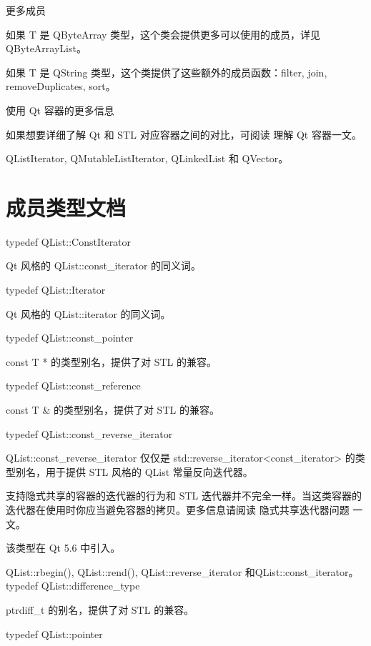 
更多成员

如果 T 是 QByteArray 类型，这个类会提供更多可以使用的成员，详见 QByteArrayList。

如果 T 是 QString 类型，这个类提供了这些额外的成员函数：filter, join, removeDuplicates, sort。

使用 Qt 容器的更多信息

如果想要详细了解 Qt 和 STL 对应容器之间的对比，可阅读 理解 Qt 容器一文。

\begin{notice}[另请参阅]
QListIterator, QMutableListIterator, QLinkedList 和 QVector。
\end{notice}


\section{成员类型文档}

typedef QList::ConstIterator

Qt 风格的 QList::const\_iterator 的同义词。

typedef QList::Iterator

Qt 风格的 QList::iterator 的同义词。

typedef QList::const\_pointer

const T * 的类型别名，提供了对 STL 的兼容。

typedef QList::const\_reference

const T \& 的类型别名，提供了对 STL 的兼容。

typedef QList::const\_reverse\_iterator

QList::const\_reverse\_iterator 仅仅是 std::reverse\_iterator<const\_iterator> 的类型别名，用于提供 STL 风格的 QList 常量反向迭代器。

\begin{notice}
支持隐式共享的容器的迭代器的行为和 STL 迭代器并不完全一样。当这类容器的迭代器在使用时你应当避免容器的拷贝。更多信息请阅读 隐式共享迭代器问题 一文。
\end{notice}

该类型在 Qt 5.6 中引入。

\begin{notice}[另请参阅]
QList::rbegin(), QList::rend(), QList::reverse\_iterator 和QList::const\_iterator。
typedef QList::difference\_type
\end{notice}

ptrdiff\_t 的别名，提供了对 STL 的兼容。

typedef QList::pointer

